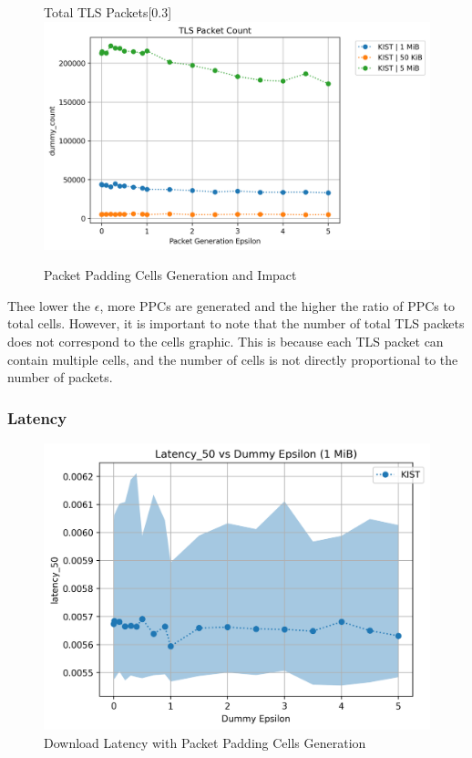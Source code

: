 \begin{figure}[htbp]
    \begin{subcaptionbox}{Total TLS Packets\label{fig:dummy_total_tls_packets}}[0.3\textwidth]
        {\includegraphics[width=\linewidth]{Chapters/Figures/Plots/Dummy/packet_count_50_kib.png}}
    \end{subcaptionbox}
    \caption{Packet Padding Cells Generation and Impact}\label{fig:dummy_ppc_analysis}
\end{figure}

Thee lower the $\epsilon$, more PPCs are generated and the higher the ratio of PPCs to total cells. However, it is important to note that the number of total TLS packets does not correspond to the cells graphic. This is because each TLS packet can contain multiple cells, and the number of cells is not directly proportional to the number of packets. 

\subsubsection{Latency}\label{sec:performance_evaluation_latency_tls_packets}

\begin{figure}[htbp]
    \centering
    \includegraphics[scale=0.4]{Chapters/Figures/Plots/Dummy/latency_50_dummy_1_mib.png}
    \caption{Download Latency with Packet Padding Cells Generation}\label{fig:dummy_latency_tls_packets}
\end{figure}

